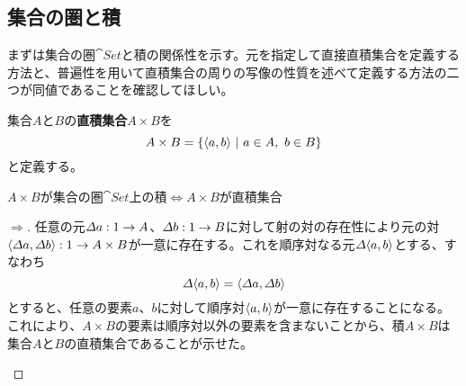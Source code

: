\subsection{集合の圏と積}\label{chap-5.1-sets-and-product}
	まずは集合の圏$\cat{Set}$と積の関係性を示す。元を指定して直接直積集合を定義する方法と、普遍性を用いて直積集合の周りの写像の性質を述べて定義する方法の二つが同値であることを確認してほしい。
	\begin{define}[直積集合]\label{def-product-set}
		集合$A$と$B$の\textbf{直積集合}$A\times B$を\[A\times B =\{\langle a,b\rangle\ |\ a\in A,\ b\in B\}\]と定義する。
	\end{define}
	\begin{prop}[直積と積の同値性]\label{prop-equivalence-product-set-and-product}
    $A\times B$が集合の圏$\cat{Set}$上の積$\iff A\times B$が直積集合
	\end{prop}
	\begin{proof}[$\Longrightarrow$]
		任意の元$\varDelta a:1\rightarrow A$、$\varDelta b:1\rightarrow B$に対して射の対の存在性により元の対$\langle \varDelta a,\varDelta b\rangle:1\rightarrow A\times B$が一意に存在する。これを順序対なる元$\varDelta\langle a,b\rangle$とする、すなわち\[\varDelta\langle a,b\rangle = \langle \varDelta a,\varDelta b\rangle\]とすると、任意の要素$a$、$b$に対して順序対$\langle a,b\rangle$が一意に存在することになる。これにより、$A\times B$の要素は順序対以外の要素を含まないことから、積$A\times B$は集合$A$と$B$の直積集合であることが示せた。
		\begin{center}
		\end{center}
	\end{proof}
